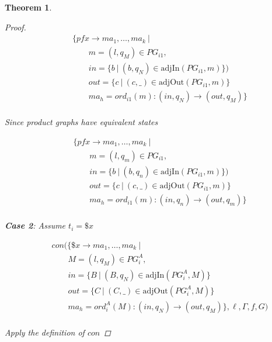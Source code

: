 \documentclass[twocolumn, openany]{sig-alternate-10pt}
\newtheorem{thm}{Theorem}
\begin{document}
\begin{thm}
\begin{proof}
  \[ \begin{array}{l}
     ~~~~~~~~~ \{ pfx \rightarrow ma_1, \dots, ma_k ~\vert~ \\
     ~~~~~~~~~~~~~~~~~~ m = (l,q_M) \in PG_{i1}, \\
     ~~~~~~~~~~~~~~~~~~ in = \{ b ~\vert~ (b,q_N) \in \text{adjIn}(PG_{i1},m) \}) \\
     ~~~~~~~~~~~~~~~~~~ out = \{ c ~\vert~ (c,\_) \in \text{adjOut}(PG_{i1},m) \} \\
     ~~~~~~~~~~~~~~~~~~ ma_h = ord_{i1}(m) : (in,q_N) \rightarrow (out,q_M) \} \\
  \end{array} \]%

  Since product graphs have equivalent states

  \[ \begin{array}{l}
     ~~~~~~~~~ \{ pfx \rightarrow ma_1, \dots, ma_k ~\vert~ \\
     ~~~~~~~~~~~~~~~~~~ m = (l,q_m) \in PG_{i1}, \\
     ~~~~~~~~~~~~~~~~~~ in = \{ b ~\vert~ (b,q_n) \in \text{adjIn}(PG_{i1},m) \}) \\
     ~~~~~~~~~~~~~~~~~~ out = \{ c ~\vert~ (c,\_) \in \text{adjOut}(PG_{i1},m) \} \\
     ~~~~~~~~~~~~~~~~~~ ma_h = ord_{i1}(m) : (in,q_n) \rightarrow (out,q_m) \} \\
  \end{array} \]%

  \vspace{1em}
  \textbf{Case 2}: Assume $t_i = \$x$

  \[ \begin{array}{l}
     ~~~~~~~~~ con(\{ \$x \rightarrow ma_1, \dots, ma_k ~\vert~ \\
     ~~~~~~~~~~~~~~~~~~ M = (l,q_M) \in PG^A_i, \\
     ~~~~~~~~~~~~~~~~~~ in = \{ B ~\vert~ (B,q_N) \in \text{adjIn}(PG^A_i,M) \} \\
     ~~~~~~~~~~~~~~~~~~ out = \{ C ~\vert~ (C,\_) \in \text{adjOut}(PG^A_i,M) \} \\
     ~~~~~~~~~~~~~~~~~~ ma_h = ord^A_i(M) : (in,q_N) \rightarrow (out,q_M) \},\ell,\Gamma,f,G) \\
  \end{array} \]%

  Apply the definition of $con$


\end{proof}
\end{thm}
\end{document}
